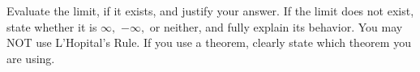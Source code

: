 \documentclass[addpoints,12pt]{exam}
\begin{document}
\begin{questions}




\question Evaluate the limit, if it exists, and justify your answer. If the limit does not exist, state
whether it is $\infty,$ $-\infty,$ or neither, and fully explain its behavior. You may NOT use
L'Hopital's Rule. If you use a theorem, clearly state which theorem you are using.

\end{questions}
\end{document}
